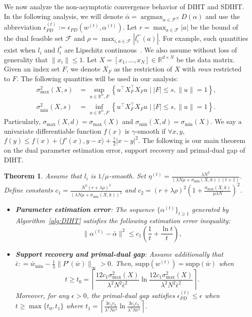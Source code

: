 \documentclass[11pt]{article}
\newtheorem{theorem}{Theorem}
\newcommand{\supp}{\text{supp}}
\newcommand{\argmax}{\mathop{\arg\max}}
\numberwithin{equation}{section}
\numberwithin{table}{section}
\numberwithin{figure}{section}
\begin{document}
We now analyze the non-asymptotic convergence behavior of DIHT and SDIHT. In the following analysis, we will denote $\bar\alpha = \argmax_{\alpha \in \mathcal{F}^N} D(\alpha)$ and use the abbreviation $\epsilon_{PD}^{(t)}:= \epsilon_{PD}(w^{(t)},\alpha^{(t)})$. Let $r=\max_{a\in \mathcal{F}}|a|$ be the bound of the dual feasible set $\mathcal{F}$ and $\rho=\max_{i, a\in \mathcal{F}}| l_i^{*'}(a)|$. For example, such quantities exist when $l_i$ and $l^*_i$ are Lipschitz continuous~\citep{shalev2013stochastic}. We also assume without loss of generality that $\|x_i\|\le 1$. Let $X=[x_1,...,x_N]\in \mathbb{R}^{d\times N}$ be the data matrix. Given an index set $F$, we denote $X_F$ as the restriction of $X$ with \emph{rows} restricted to $F$. The following quantities will be used in our analysis:
\[
\begin{aligned}
\sigma_{\max}^2 (X,s) &= \sup_{u\in \mathbb{R}^n, F} \left\{ u^\top X_F^\top X_F u \mid |F| \le s, \|u\|=1 \right\}, \\
\sigma_{\min}^2(X,s)  &= \inf_{u\in \mathbb{R}^n, F} \left\{ u^\top X_F^\top X_F u \mid |F| \le s, \|u\| = 1 \right\}.
\end{aligned}
\]
Particularly, $\sigma_{\max}(X,d) = \sigma_{\max}(X)$ and $\sigma_{\min}(X,d) = \sigma_{\min}(X)$. We say a univariate differentiable function $f(x)$ is $\gamma$-smooth if $\forall x, y$, $f(y) \le f(x) + \langle f'(x), y - x \rangle + \frac{\gamma}{2} |x - y|^2$. The following is our main theorem on the dual parameter estimation error, support recovery and primal-dual gap of DIHT.
\begin{theorem}\label{thrm:DIHT_Conv}
Assume that $l_i$ is $1/\mu$-smooth. Set $\eta^{(t)} = \frac{\lambda N^2}{(\lambda N \mu + \sigma_{\min}(X,k))(t+1)}$. Define constants $c_1 = \frac{N^3 (r+\lambda\rho)^2}{(\lambda N \mu + \sigma_{\min}(X,k))^2}$ and $c_2=(r+\lambda\rho)^2\left(1+\frac{\sigma_{\max}(X,k)}{\mu\lambda N}\right)^2$.
\begin{itemize}
  \item[(a)] \emph{\textbf{Parameter estimation error}:} The sequence $\{\alpha^{(t)}\}_{t\ge 1}$ generated by Algorithm~\ref{alg:DIHT} satisfies the following estimation error inequality:
\[
\|\alpha^{(t)} - \bar\alpha\|^2  \le c_1\left(\frac{1}{t}  + \frac{\ln t}{t}\right),
\]
\item[(b)]\emph{\textbf{Support recovery and primal-dual gap}:} Assume additionally that $\bar\epsilon: = \bar w_{\min} - \frac{1}{\lambda} \|P'(\bar w)\|_\infty >0$. Then, $\supp(w^{(t)})= \supp(\bar w)$ when
  \[
t \ge t_0= \left\lceil\frac{12c_1\sigma_{\max}^2(X)}{\lambda^2 N^2 \bar\epsilon^2} \ln \frac{12c_1\sigma_{\max}^2(X)}{\lambda^2 N^2 \bar\epsilon^2}\right\rceil.
\]
Moreover, for any $\epsilon>0$, the primal-dual gap satisfies $\epsilon_{PD}^{(t)} \le \epsilon$ when $t \ge \max\{t_0, t_1\}$ where $t_1=\left\lceil\frac{3c_1c_2}{\lambda^2 N\epsilon^2}\ln\frac{3c_1c_2}{\lambda^2 N \epsilon^2}\right\rceil$.
\end{itemize}
\end{theorem}
\end{document}
